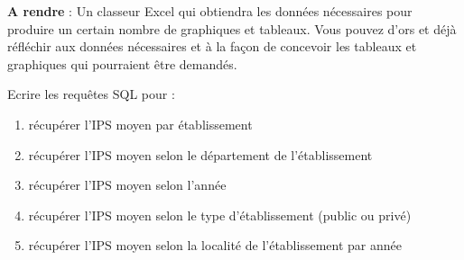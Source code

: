 \documentclass[10pt, a4paper]{article}
\begin{document}
\begin{tcolorbox}[lefttitle=1cm, colframe=gray!75!black, colback=white, title=\textbf{En sortie : A rendre. Quel modèle de gestion des
professeurs pour l’école de demain ?}]

\textbf{A rendre} : Un classeur Excel qui obtiendra les données nécessaires pour produire un certain nombre de
graphiques et tableaux.
Vous pouvez d'ors et déjà réfléchir aux données nécessaires et à la façon de concevoir les tableaux
et graphiques qui pourraient être demandés.






\begin{tcolorbox}[lefttitle=1cm, colframe=gray!75!black, colback=white, title=\textbf{Traitement des données}]
Ecrire les requêtes SQL pour :
\begin{enumerate}
    \item récupérer l'IPS moyen par établissement
    \item récupérer l'IPS moyen selon le département de l'établissement
    \item récupérer l'IPS moyen selon l'année
    \item récupérer l'IPS moyen selon le type d'établissement (public ou privé)
    \item récupérer l'IPS moyen selon la localité de l'établissement par année
\end{enumerate}
\end{tcolorbox}

\begin{tcolorbox}[lefttitle=1cm, colframe=gray!75!black, colback=white, title=\textbf{Réalisation d'un rapport}]


\end{tcolorbox}
\end{tcolorbox}
\end{document}
